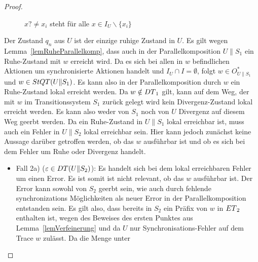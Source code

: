 \begin{proof}
\begin{itemize}
\begin{figure} [h!tbp]
\begin{center}
        \caption{$x?\neq x_i$ steht für alle $x\in I_U\backslash\{x_i\}$}
\label{UohneEmitIundO}
      \end{center}
      \end{figure}
      Der Zustand $q_n$ aus $U$ ist der einzige ruhige Zustand in $U$.
      Es gilt wegen Lemma~\ref{lemRuheParallelkomp}, dass auch in der
      Parallelkomposition $U\|S_1$ ein Ruhe-Zustand mit $w$ erreicht wird. Da
      es sich bei allen in $w$ befindlichen Aktionen um synchronisierte
      Aktionen handelt und $I_U\cap I=\emptyset$, folgt $w\in O_{U\|S_1}^*$ und
      $w\in StQT{}(U\|S_1)$. Es kann also in der Parallelkomposition durch $w$
      ein Ruhe-Zustand lokal erreicht werden. Da $w\notin DT{}_1$ gilt, kann
      auf dem Weg, der mit $w$ im Transitionssystem $S_1$ zurück gelegt wird
      kein Divergenz-Zustand lokal erreicht werden. Es kann also weder von
      $S_1$ noch von $U$ Divergenz auf diesem Weg geerbt werden. Da ein
      Ruhe-Zustand in $U\|S_1$ lokal erreichbar ist, muss auch ein Fehler in
      $U\|S_2$ lokal erreichbar sein. Hier kann jedoch zunächst keine Aussage
      darüber getroffen werden, ob das $w$ ausführbar ist und ob es sich bei
      dem Fehler um Ruhe oder Divergenz handelt.
      \begin{itemize}
        \item Fall 2a) ($\varepsilon\in DT{}(U\|S_2)$): Es handelt sich bei
          dem lokal erreichbaren Fehler um einen Error. Es ist somit ist nicht
          relevant, ob das $w$ ausführbar ist. Der Error kann sowohl von $S_2$
          geerbt sein, wie auch durch fehlende synchronizations Möglichkeiten
          als neuer Error in der Parallelkomposition entstanden sein. Es gilt
          also, dass bereits in $S_2$ ein Präfix von $w$ in $ET{}_2$ enthalten
          ist, wegen des Beweises des ersten Punktes aus
          Lemma~\ref{lemVerfeinerung} und da $U$ nur Synchronisations-Fehler
          auf dem Trace $w$ zulässt. Da die Menge \ET{} unter \cont{}

\end{itemize}
\end{itemize}
\end{proof}
